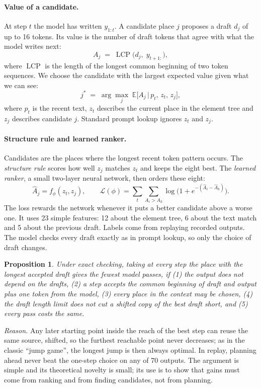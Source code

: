\documentclass[10pt,a4paper]{article}
\newtheorem{proposition}{Proposition}
\begin{document}
\paragraph{Value of a candidate.} At step $t$ the model has written $y_{1:t}$. A candidate place $j$ proposes a draft $d_j$ of up to 16 tokens. Its value is the number of draft tokens that agree with what the model writes next:
\begin{equation}
A_j \;=\; \operatorname{LCP}\big(d_j,\; y_{t+1:}\big),
\end{equation}
where $\operatorname{LCP}$ is the length of the longest common beginning of two token sequences. We choose the candidate with the largest expected value given what we can see:
\begin{equation}
j^{*} \;=\; \arg\max_{j}\; \mathbb{E}\big[A_j \,\big|\, p_t,\, z_t,\, z_j\big],
\end{equation}
where $p_t$ is the recent text, $z_t$ describes the current place in the element tree and $z_j$ describes candidate $j$. Standard prompt lookup ignores $z_t$ and $z_j$.

\paragraph{Structure rule and learned ranker.} Candidates are the places where the longest recent token pattern occurs. The \emph{structure rule} scores how well $z_j$ matches $z_t$ and keeps the eight best. The \emph{learned ranker}, a small two-layer neural network, then orders these eight:
\begin{equation}
\hat{A}_j = f_{\phi}(z_t, z_j),\qquad
\mathcal{L}(\phi) = \sum_{t}\sum_{A_i > A_k} \log\!\Big(1 + e^{-(\hat{A}_i - \hat{A}_k)}\Big).
\end{equation}
The loss rewards the network whenever it puts a better candidate above a worse one. It uses 23 simple features: 12 about the element tree, 6 about the text match and 5 about the previous draft. Labels come from replaying recorded outputs. The model checks every draft exactly as in prompt lookup, so only the choice of draft changes.

\begin{proposition}
Under exact checking, taking at every step the place with the longest accepted draft gives the fewest model passes, if (1) the output does not depend on the drafts, (2) a step accepts the common beginning of draft and output plus one token from the model, (3) every place in the context may be chosen, (4) the draft length limit does not cut a shifted copy of the best draft short, and (5) every pass costs the same.
\end{proposition}
\noindent\emph{Reason.} Any later starting point inside the reach of the best step can reuse the same source, shifted, so the furthest reachable point never decreases; as in the classic ``jump game'', the longest jump is then always optimal. In replay, planning ahead never beat the one-step choice on any of 70 outputs. The argument is simple and its theoretical novelty is small; its use is to show that gains must come from ranking and from finding candidates, not from planning.
\end{document}
